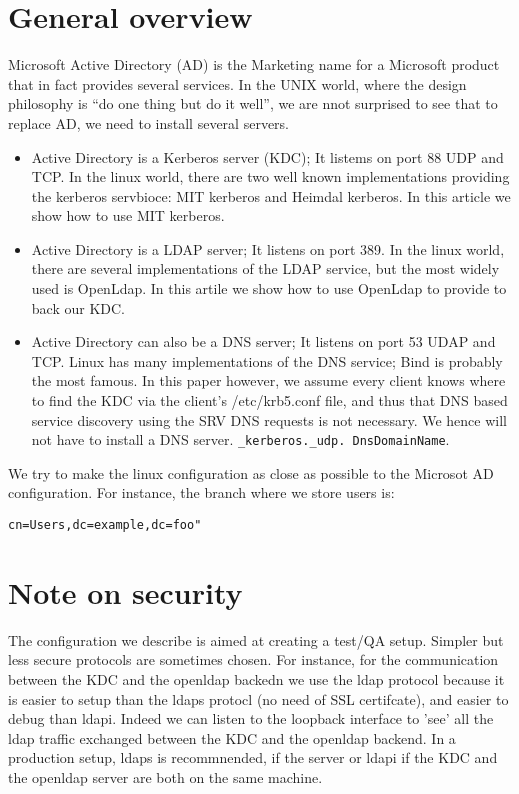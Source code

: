 \documentclass[12pt,a4]{article}
\begin{document}
\section{General overview}
Microsoft Active Directory (AD) is the Marketing name for a Microsoft product that in fact provides several services.
In the UNIX world, where the design philosophy is ``do one thing but do it well'', we are nnot surprised to see that to replace AD, we need to install several servers.
\begin{itemize}
\item Active Directory is a Kerberos server (KDC); It listems on port 88 UDP and TCP. In the linux world, there are two well known implementations providing the kerberos servbioce: MIT kerberos and Heimdal kerberos.  In this article we show how to use MIT kerberos.
\item Active Directory is a LDAP server; It listens on port 389. In the linux world, there are several implementations of the LDAP service, but the most widely used is OpenLdap. In this artile we show how to use OpenLdap to provide to back our KDC.
\item Active Directory can also be a DNS server; It listens on port 53 UDAP and TCP. Linux has many implementations of the DNS service; Bind is probably the most famous. In this paper however, we assume every client knows where to find the KDC via the client's /etc/krb5.conf file, and thus that DNS based service discovery using the SRV DNS requests is not necessary. We hence will not have to install a DNS server.
{\tt \_kerberos.\_udp. DnsDomainName}. \cite{dnssrv}
\end{itemize}
We try to make the linux configuration as close as possible to the Microsot AD configuration. For instance, the branch where we store users is:

\begin{verbatim}
cn=Users,dc=example,dc=foo"
\end{verbatim}

\section{Note on security}
The configuration we describe is aimed at creating a test/QA setup.
Simpler but less secure protocols are sometimes chosen. For instance, for the communication between the KDC and the openldap backedn we use the ldap protocol because it is easier to setup than the ldaps protocl (no need of SSL certifcate), and easier to debug than ldapi. Indeed we can listen to the loopback interface to 'see' all the ldap traffic exchanged between the KDC and the openldap backend.  In a production setup, ldaps is recommnended, if the server or ldapi if the KDC and the openldap server are both on the same machine.
\end{document}

